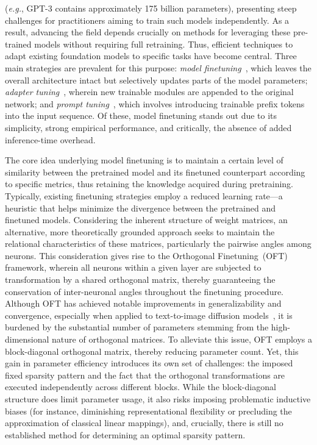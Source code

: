 (\emph{e.g.}, GPT-3 contains approximately 175 billion parameters), presenting steep challenges for practitioners aiming to train such models independently. As a result, advancing the field depends crucially on methods for leveraging these pre-trained models without requiring full retraining. Thus, efficient techniques to adapt existing foundation models to specific tasks have become central. Three main strategies are prevalent for this purpose: \emph{model finetuning}~\cite{hulora2022,zaken2022bitfit,guo2020parameter,raffel2020exploring,qiu2023controlling,zhang2022adaptive,chavan2023one}, which leaves the overall architecture intact but selectively updates parts of the model parameters; \emph{adapter tuning}~\cite{rebuffi2017learning,houlsby2019parameter,pfeiffer2020adapterfusion,lin2020exploring,he2021towards}, wherein new trainable modules are appended to the original network; and \emph{prompt tuning}~\cite{li2021prefix,lester2021power}, which involves introducing trainable prefix tokens into the input sequence. Of these, model finetuning stands out due to its simplicity, strong empirical performance, and critically, the absence of added inference-time overhead.

The core idea underlying model finetuning is to maintain a certain level of similarity between the pretrained model and its finetuned counterpart according to specific metrics, thus retaining the knowledge acquired during pretraining. Typically, existing finetuning strategies employ a reduced learning rate—a heuristic that helps minimize the divergence between the pretrained and finetuned models. Considering the inherent structure of weight matrices, an alternative, more theoretically grounded approach seeks to maintain the relational characteristics of these matrices, particularly the pairwise angles among neurons. This consideration gives rise to the Orthogonal Finetuning~(OFT)~\cite{qiu2023controlling} framework, wherein all neurons within a given layer are subjected to transformation by a shared orthogonal matrix, thereby guaranteeing the conservation of inter-neuronal angles throughout the finetuning procedure. Although OFT has achieved notable improvements in generalizability and convergence, especially when applied to text-to-image diffusion models~\cite{qiu2023controlling}, it is burdened by the substantial number of parameters stemming from the high-dimensional nature of orthogonal matrices. To alleviate this issue, OFT employs a block-diagonal orthogonal matrix, thereby reducing parameter count. Yet, this gain in parameter efficiency introduces its own set of challenges: the imposed fixed sparsity pattern and the fact that the orthogonal transformations are executed independently across different blocks. While the block-diagonal structure does limit parameter usage, it also risks imposing problematic inductive biases (for instance, diminishing representational flexibility or precluding the approximation of classical linear mappings), and, crucially, there is still no established method for determining an optimal sparsity pattern.

